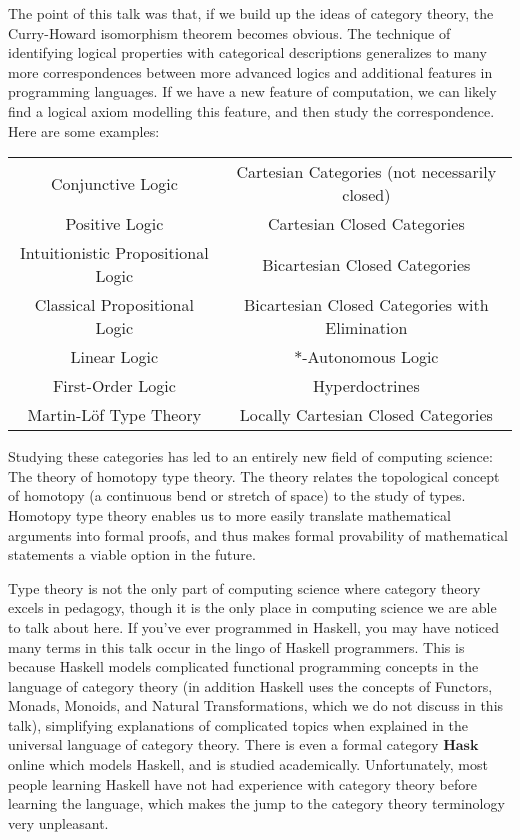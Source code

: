\documentclass{article}
\theoremstyle{plain}
\begin{document}
The point of this talk was that, if we build up the ideas of category theory, the Curry-Howard isomorphism theorem becomes obvious. The technique of identifying logical properties with categorical descriptions generalizes to many more correspondences between more advanced logics and additional features in programming languages. If we have a new feature of computation, we can likely find a logical axiom modelling this feature, and then study the correspondence. Here are some examples:
%
\begin{center}
\begin{tabular}{ | c | c | }
    \hline
    Conjunctive Logic & Cartesian Categories (not necessarily closed)\\
    Positive Logic & Cartesian Closed Categories\\
    Intuitionistic Propositional Logic & Bicartesian Closed Categories\\
    Classical Propositional Logic & Bicartesian Closed Categories with Elimination\\
    Linear Logic & $*$-Autonomous Logic\\
    First-Order Logic & Hyperdoctrines\\
    Martin-L\"{o}f Type Theory & Locally Cartesian Closed Categories\\
    \hline
\end{tabular}
\end{center}
%
Studying these categories has led to an entirely new field of computing science: The theory of homotopy type theory. The theory relates the topological concept of homotopy (a continuous bend or stretch of space) to the study of types. Homotopy type theory enables us to more easily translate mathematical arguments into formal proofs, and thus makes formal provability of mathematical statements a viable option in the future.

Type theory is not the only part of computing science where category theory excels in pedagogy, though it is the only place in computing science we are able to talk about here. If you've ever programmed in Haskell, you may have noticed many terms in this talk occur in the lingo of Haskell programmers. This is because Haskell models complicated functional programming concepts in the language of category theory (in addition Haskell uses the concepts of Functors, Monads, Monoids, and Natural Transformations, which we do not discuss in this talk), simplifying explanations of complicated topics when explained in the universal language of category theory. There is even a formal category $\mathbf{Hask}$ online which models Haskell, and is studied academically. Unfortunately, most people learning Haskell have not had experience with category theory before learning the language, which makes the jump to the category theory terminology very unpleasant.
\end{document}
